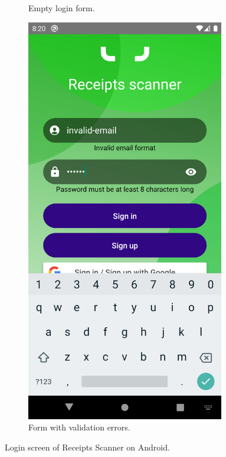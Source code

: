 \documentclass[
  printed, %
  table,   %
  oneside, %
  lof,     %
  lot,     %
]{fithesis3}
\newcommand\half{0.45}
\newcommand\subfigsize{0.95}
\begin{document}
\begin{enumerate}
\begin{figure}[H]
\begin{subfigure}[t]{\half\textwidth}
          \caption{Empty login form.}
        \end{subfigure}
        \begin{subfigure}[t]{\half\textwidth}
          \centering
          \includegraphics[width=\subfigsize\textwidth]{figures/screens/android/light/login_validation}
          \caption{Form with validation \mbox{errors}.}
          \label{fig:login_validation}
        \end{subfigure}
        \caption{Login screen of Receipts Scanner on Android.}
        \label{fig:login_screen}
    \end{figure}
    

\end{enumerate}
\end{document}

